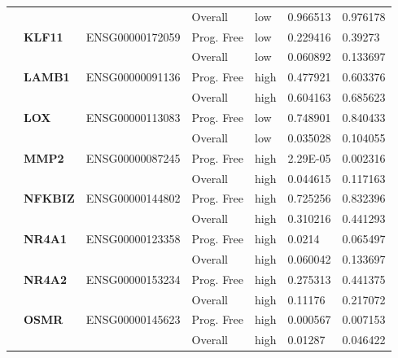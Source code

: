 \begin{spacing}{1}
{\begin{longtable}{|>{\bfseries}p{2cm}|>{\bfseries}p{1.9cm}|p{2.8cm}|p{2cm}|p{2cm}|p{1.5cm}|p{1.5cm}|}
            \hhline{~~~----}
             &          &                 & Overall    & low  & 0.966513 & 0.976178 \\
            \hhline{~======}
             & KLF11    & ENSG00000172059 & Prog. Free & low  & 0.229416 & 0.39273  \\
            \hhline{~~~----}
             &          &                 & Overall    & low  & 0.060892 & 0.133697 \\
            \hhline{~======}
             & LAMB1    & ENSG00000091136 & Prog. Free & high & 0.477921 & 0.603376 \\
            \hhline{~~~----}
             &          &                 & Overall    & high & 0.604163 & 0.685623 \\
            \hhline{~======}
             & LOX      & ENSG00000113083 & Prog. Free & low  & 0.748901 & 0.840433 \\
            \hhline{~~~----}
             &          &                 & Overall    & low  & 0.035028 & 0.104055 \\
            \hhline{~======}
             & MMP2     & ENSG00000087245 & Prog. Free & high & 2.29E-05 & 0.002316 \\
            \hhline{~~~----}
             &          &                 & Overall    & high & 0.044615 & 0.117163 \\
            \hhline{~======}
             & NFKBIZ   & ENSG00000144802 & Prog. Free & high & 0.725256 & 0.832396 \\
            \hhline{~~~----}
             &          &                 & Overall    & high & 0.310216 & 0.441293 \\
            \hhline{~======}
             & NR4A1    & ENSG00000123358 & Prog. Free & high & 0.0214   & 0.065497 \\
            \hhline{~~~----}
             &          &                 & Overall    & high & 0.060042 & 0.133697 \\
            \hhline{~======}
             & NR4A2    & ENSG00000153234 & Prog. Free & high & 0.275313 & 0.441375 \\
            \hhline{~~~----}
             &          &                 & Overall    & high & 0.11176  & 0.217072 \\
            \hhline{~======}
             & OSMR     & ENSG00000145623 & Prog. Free & high & 0.000567 & 0.007153 \\
            \hhline{~~~----}
             &          &                 & Overall    & high & 0.01287  & 0.046422 \\

\end{longtable}}
\end{spacing}
